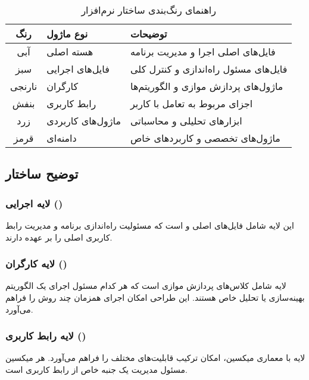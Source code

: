 \begin{table}[H]
\centering
\caption{راهنمای رنگ‌بندی ساختار نرم‌افزار}
\begin{tabular}{|c|l|p{8cm}|}
\hline
\textbf{رنگ} & \textbf{نوع ماژول} & \textbf{توضیحات} \\
\hline
\cellcolor{blue!20} آبی & هسته اصلی & فایل‌های اصلی اجرا و مدیریت برنامه \\
\hline
\cellcolor{green!20} سبز & فایل‌های اجرایی & فایل‌های مسئول راه‌اندازی و کنترل کلی \\
\hline
\cellcolor{orange!20} نارنجی & کارگران & ماژول‌های پردازش موازی و الگوریتم‌ها \\
\hline
\cellcolor{purple!20} بنفش & رابط کاربری & اجزای مربوط به تعامل با کاربر \\
\hline
\cellcolor{yellow!20} زرد & ماژول‌های کاربردی & ابزارهای تحلیلی و محاسباتی \\
\hline
\cellcolor{red!20} قرمز & دامنه‌ای & ماژول‌های تخصصی و کاربردهای خاص \\
\hline
\end{tabular}
\end{table}
\subsection{توضیح ساختار}

\subsubsection{لایه اجرایی ()}

این لایه شامل فایل‌های اصلی  و  است که مسئولیت راه‌اندازی برنامه و مدیریت رابط کاربری اصلی را بر عهده دارند.

\subsubsection{لایه کارگران ()}

لایه  شامل کلاس‌های پردازش موازی است که هر کدام مسئول اجرای یک الگوریتم بهینه‌سازی یا تحلیل خاص هستند. این طراحی امکان اجرای همزمان چند روش را فراهم می‌آورد.

\subsubsection{لایه رابط کاربری ()}

لایه  با معماری میکسین، امکان ترکیب قابلیت‌های مختلف را فراهم می‌آورد. هر میکسین مسئول مدیریت یک جنبه خاص از رابط کاربری است.

